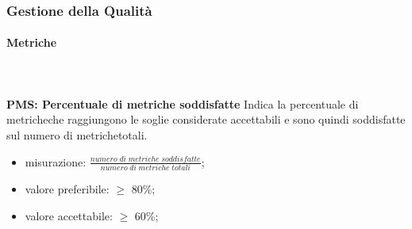 		\subsubsection{Gestione della Qualità}
			\paragraph{Metriche} \mbox{} \\ \\
				\textbf{PMS: Percentuale di metriche soddisfatte} Indica la percentuale di metriche\glosp che raggiungono le soglie considerate accettabili e sono quindi soddisfatte sul numero di metriche\glosp totali.
				\begin{itemize}
					\item misurazione: $\frac{numero \; di \; metriche \; soddisfatte}{numero \; di \; metriche \; totali}$;
					\item valore preferibile: $\ge$ 80\%;
					\item valore accettabile: $\ge$ 60\%;
				\end{itemize}


		  
			
				

